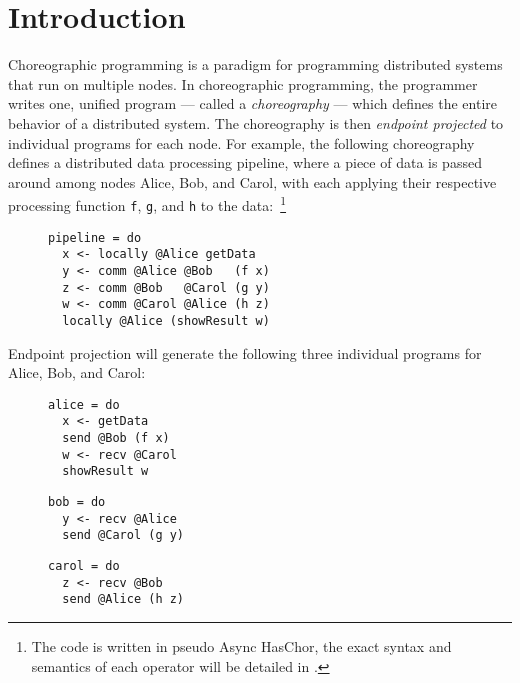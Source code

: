 \section{Introduction}

Choreographic programming is a paradigm for programming distributed systems that run on multiple nodes.
%
In choreographic programming, the programmer writes one, unified program --- called a \emph{choreography} --- which defines the entire behavior of a distributed system.
%
The choreography is then \emph{endpoint projected} to individual programs for each node.
%
For example, the following choreography defines a distributed data processing pipeline, where a piece of data is passed around among nodes Alice, Bob, and Carol, with each applying their respective processing function \texttt{f}, \texttt{g}, and \texttt{h} to the data:~\footnote{The code is written in pseudo Async HasChor, the exact syntax and semantics of each operator will be detailed in .}

\begin{figure}[h]
\centering
\begin{minipage}{0.4\textwidth}
\begin{verbatim}
pipeline = do
  x <- locally @Alice getData
  y <- comm @Alice @Bob   (f x)
  z <- comm @Bob   @Carol (g y)
  w <- comm @Carol @Alice (h z)
  locally @Alice (showResult w)
\end{verbatim}
\end{minipage}
\end{figure}

\noindent Endpoint projection will generate the following three individual programs for Alice, Bob, and Carol:

\begin{figure}[h]
\hspace{1cm}
\begin{minipage}[t]{0.3\textwidth}
\begin{verbatim}
alice = do
  x <- getData
  send @Bob (f x)
  w <- recv @Carol
  showResult w
\end{verbatim}
\end{minipage}
\begin{minipage}[t]{0.3\textwidth}
\begin{verbatim}
bob = do
  y <- recv @Alice
  send @Carol (g y)
\end{verbatim}
\end{minipage}
\begin{minipage}[t]{0.3\textwidth}
\begin{verbatim}
carol = do
  z <- recv @Bob
  send @Alice (h z)
\end{verbatim}
\end{minipage}
\end{figure}

